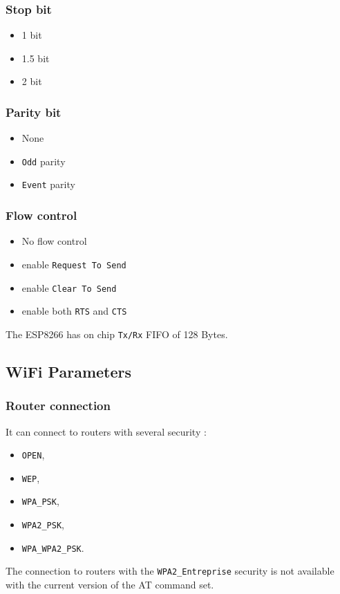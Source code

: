 \documentclass[11pt]{article}
\begin{document}
\subsubsection{Stop bit}
\begin{itemize}
    \item 1 bit
    \item 1.5 bit
    \item 2 bit
\end{itemize}

\subsubsection{Parity bit}
\begin{itemize}
    \item None
    \item \texttt{Odd} parity
    \item \texttt{Event} parity
\end{itemize}

\subsubsection{Flow control}
\begin{itemize}
    \item No flow control
    \item enable \texttt{Request To Send}
    \item enable \texttt{Clear To Send}
    \item enable both \texttt{RTS} and \texttt{CTS}
\end{itemize}

The ESP8266 has on chip \texttt{Tx/Rx} FIFO of 128 Bytes.

\subsection{WiFi Parameters}
\subsubsection{Router connection}
It can connect to routers with several security : 
\begin{itemize}
\item \texttt{OPEN},
\item \texttt{WEP},
\item \texttt{WPA\_PSK},
\item \texttt{WPA2\_PSK},
\item \texttt{WPA\_WPA2\_PSK}.
\end{itemize}
The connection to routers with the \texttt{WPA2\_Entreprise} security is not available 
with the current version of the AT command set.\\
\end{document}
